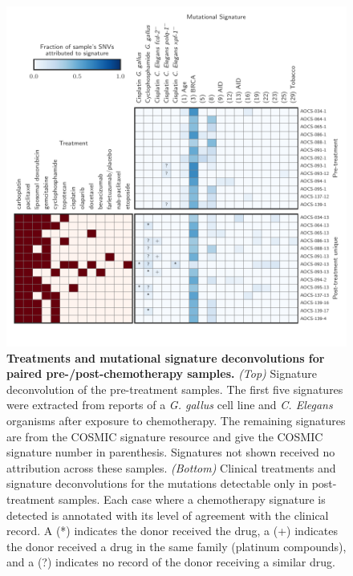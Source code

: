 \begin{figure}[htbp]
\centering
\includegraphics[scale=1.0]{figures/signatures.pdf}
\caption{\textbf{Treatments and mutational signature deconvolutions for paired pre-/post-chemotherapy samples.} \textit{(Top)} Signature deconvolution of the pre-treatment samples. The first five signatures were extracted from reports of a \textit{G. gallus}\cite{Szikriszt_2016} cell line and \textit{C. Elegans}\cite{Meier_2014} organisms after exposure to chemotherapy. The remaining signatures are from the COSMIC signature resource\cite{364242} and give the COSMIC signature number in parenthesis. Signatures not shown received no attribution across these samples. \textit{(Bottom)} Clinical treatments and signature deconvolutions for the mutations detectable only in post-treatment samples. Each case where a chemotherapy signature is detected is annotated with its level of agreement with the clinical record. A (*) indicates the donor received the drug, a (+) indicates the donor received a drug in the same family (platinum compounds), and a (?) indicates no record of the donor receiving a similar drug.}
\label{fig:signatures}
\end{figure}

